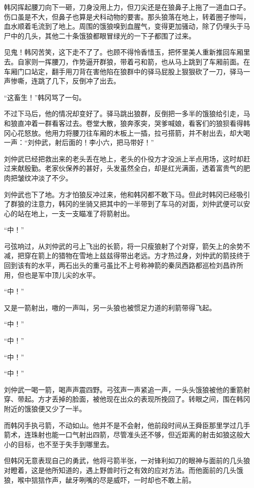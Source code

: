 韩冈挥起腰刀向下一砸，刀身没用上力，但刀尖还是在狼鼻子上拖了一道血口子。伤口虽是不大，但鼻子也算是犬科动物的要害。那头狼落在地上，转着圈子惨叫，血水顺着毛流到了地上。周围的饿狼嗅到血腥气，变得更加骚动，除了仍埋头于马尸中的几头，其他二十条饿狼都眼冒绿光的一下子都围了过来。

见鬼！韩冈苦笑，这下走不了了。也顾不得怜香惜玉，把怀里美人重新推回车厢里去。自家则一挥腰刀，作势逼开群狼，带着弓和箭，也从马上跳到了车厢前面。在车厢门口站定，翻手用刀背在害他陷在狼群中的驿马屁股上狠狠砍了一刀，驿马一声惨嘶，连跳了几下，反倒冲了出去。

“这畜生！”韩冈骂了一句。

不过下马后，他的情况却变好了。驿马跳出狼群，反倒把一多半的饿狼给引走，马和狼直冲着一群看客过去。卷堂大散，狼奔豕突，哭爹喊娘，看客们的狼狈看得韩冈心花怒放。他用力将腰刀往车厢的木板上一插，拉弓搭箭，并不射出去，却大喝一声：“刘仲武，射后面的！李小六，把马带好！”

刘仲武已经把救出来的老头丢在地上，老头的仆役方才没派上半点用场，这时却赶过来献殷勤。老家伙保养的甚好，头发虽然全白，却是红光满面，透着富贵气的肥肉把皱纹冲淡了不少。

刘仲武也下了地。方才怕狼反冲过来，他和韩冈都不敢下马。但此时韩冈已经吸引了群狼的注意力，韩冈的坐骑又把其中的一半带到了车马的对面，刘仲武便可以安心的站在地上，一支一支瞄准了将箭射出。

“中！”

弓弦响过，从刘仲武的弓上飞出的长箭，将一只瘦狼射了个对穿，箭矢上的余势不减，把穿在箭上的猎物在雪地上兹兹得带出老远。方才热过身，刘仲武的箭技终于回到该有的水平，两石出头的重弓虽比不上号称神箭的秦凤西路都巡检刘昌祚所用，但也是军中顶儿尖的水平。

“中！”

又是一箭射出，嗷的一声叫，另一头狼也被惯足力道的利箭带得飞起。

“中！”

“中！”

“中！”

“中！”

刘仲武一喝一箭，喝声声震四野。弓弦声一声紧追一声，一头头饿狼被他的重箭射穿、带起。方才丢掉的脸面，被他现在出众的表现所挽回了。转眼之间，围在韩冈附近的饿狼便又少了一半。

而韩冈手执弓箭，不动如山。他并不是不会射，他前段时间从王舜臣那里学过几手箭术，连珠射也能一口气射出四箭，尽管准头还不够，但近距离的射击如狼这般大小的目标，也不至于失手到哪里去。

但韩冈无意表现自己的勇武，他将弓箭半张，一对锋利如刀的眼神与面前的几头狼对瞪着，这是他所知道的，遇上野兽时行之有效的应对方法。而他面前的几头饿狼，喉中狺狺作声，龇牙咧嘴的尽是威吓，一时却也不敢上前。

